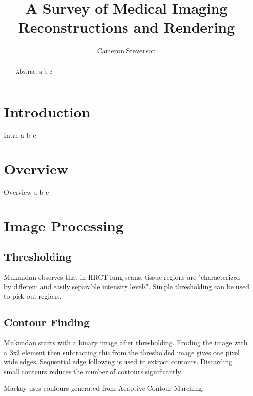 \documentclass[acmsmall]{acmart}
\begin{document}
\title{A Survey of Medical Imaging Reconstructions and Rendering}
\author{Cameron Stevenson}
 
\begin{abstract}
Abstract a b c
\end{abstract}

\maketitle

\section{Introduction}

Intro a b c

\section{Overview}

Overview a b c

\section{Image Processing}

\subsection{Thresholding}
Mukundan \cite{mukundan2016reconstruction} observes that in HRCT lung scans, tissue regions are "characterized by different and easily separable intensity levels". Simple thresholding can be used to pick out regions. 

\subsection{Contour Finding}

Mukundan \cite{mukundan2016reconstruction} starts with a binary image after thresholding. Eroding the image with a 3x3 element then subtracting this from the thresholded image gives one pixel wide edges. Sequential edge following is used to extract contours. Discarding small contours reduces the number of contours significantly.

Mackay \cite{mackay2019robust} uses contours generated from Adaptive Contour Marching.
\end{document}
